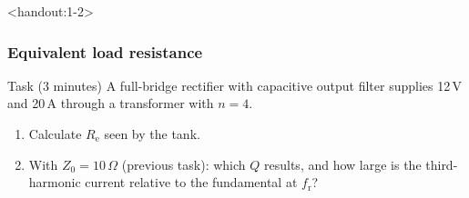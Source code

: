 \begin{frame}<handout:1-2>
	\frametitle{Equivalent load resistance}
	\begin{block}{Task (3 minutes)}
		A full-bridge rectifier with capacitive output filter supplies 12\,V and 20\,A through a transformer with $n=4$.
		\begin{enumerate}
			\item Calculate $R_\mathrm{e}$ seen by the tank.
			\item With $Z_0=10\,\Omega$ (previous task): which $Q$ results, and how large is the third-harmonic current relative to the fundamental at $f_\mathrm{r}$?
		\end{enumerate}
	\end{block}
\end{frame}

